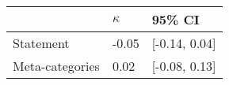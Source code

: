 \begin{tabular}{lll}
\hline
 & $\kappa$ & 95\% CI  \\
\hline
Statement & -0.05 & [-0.14, 0.04] \\
Meta-categories & 0.02 & [-0.08, 0.13] \\
\hline
\end{tabular}
